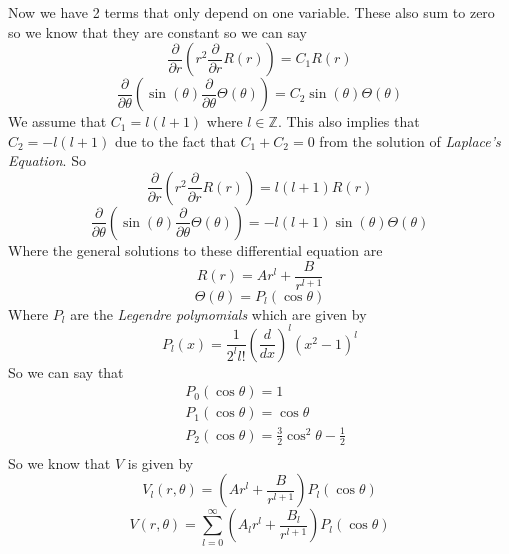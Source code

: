 \documentclass[11pt]{article}
\numberwithin{equation}{section}
\begin{document}
\begin{enumerate}[(i)]
Now we have 2 terms that only depend on one variable. These also sum to zero so we know that they are constant so we can say
$$\frac{\partial}{\partial r}\left(r^2\frac{\partial }{\partial r}R(r)\right) = C_1 R(r)$$
$$\frac{\partial}{\partial \theta}\left(\sin(\theta)\frac{\partial}{\partial \theta}\Theta(\theta)\right) = C_2\sin(\theta)\Theta(\theta)$$ 
We assume that $C_1 = l(l+1)$ where $l\in\mathbb{Z}$. This also implies that $C_2 = -l(l+1)$ due to the fact that $C_1+C_2=0$ from the solution of \emph{Laplace's Equation}. So
$$\frac{\partial}{\partial r}\left(r^2\frac{\partial }{\partial r}R(r)\right) = l(l+1)R(r)$$
$$\frac{\partial}{\partial \theta}\left(\sin(\theta)\frac{\partial}{\partial \theta}\Theta(\theta)\right) =-l(l+1)\sin(\theta)\Theta(\theta)$$ 
Where the general solutions to these differential equation are
$$R(r) = Ar^l+\frac{B}{r^{l+1}}$$
$$\Theta(\theta) = P_l(\cos\theta)$$
Where $P_l$ are the \emph{Legendre polynomials} which are given by
$$P_l(x) = \frac{1}{2^ll!}\left(\frac{d}{dx}\right)^l(x^2-1)^l$$
So we can say that
\begin{align*}
&P_0(\cos\theta) = 1\\
&P_1(\cos\theta) = \cos\theta \\
&P_2(\cos\theta) =  \frac{3}{2}\cos^2\theta-\frac{1}{2}\\ 
\end{align*}
So we know that $V$ is given by
$$V_l(r,\theta) = \left(Ar^l+\frac{B}{r^{l+1}}\right)P_l(\cos\theta)$$
$$V(r,\theta) = \sum_{l=0}^{\infty}\left(A_lr^l+\frac{B_l}{r^{l+1}}\right)P_l(\cos\theta)$$


\end{enumerate}
\end{document}

